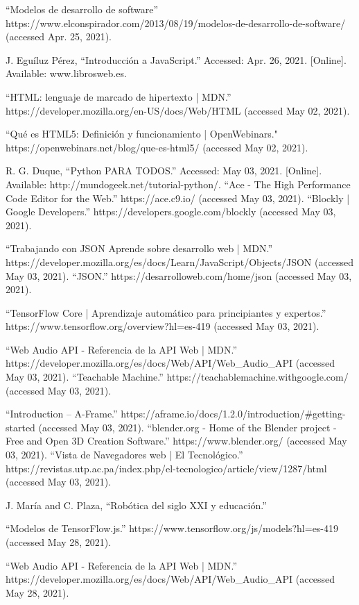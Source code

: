 \begin{thebibliography}{69}
 ``Modelos de desarrollo de software” https://www.elconspirador.com/2013/08/19/modelos-de-desarrollo-de-software/ (accessed Apr. 25, 2021).

 J. Eguíluz Pérez, “Introducción a JavaScript.” Accessed: Apr. 26, 2021. [Online]. Available: www.librosweb.es.


	``HTML: lenguaje de marcado de hipertexto | MDN.” https://developer.mozilla.org/en-US/docs/Web/HTML (accessed May 02, 2021).

 ``Qué es HTML5: Definición y funcionamiento | OpenWebinars." https://openwebinars.net/blog/que-es-html5/ (accessed May 02, 2021).


 R. G. Duque, ``Python PARA TODOS.” Accessed: May 03, 2021. [Online]. Available: http://mundogeek.net/tutorial-python/.
 ``Ace - The High Performance Code Editor for the Web.” https://ace.c9.io/ (accessed May 03, 2021).
 ``Blockly  |  Google Developers.” https://developers.google.com/blockly (accessed May 03, 2021).


 ``Trabajando con JSON \- Aprende sobre desarrollo web | MDN.” https://developer.mozilla.org/es/docs/Learn/JavaScript/Objects/JSON (accessed May 03, 2021).
 ``JSON.” https://desarrolloweb.com/home/json (accessed May 03, 2021).

 ``TensorFlow Core | Aprendizaje automático para principiantes y expertos.” https://www.tensorflow.org/overview?hl=es-419 (accessed May 03, 2021).

 ``Web Audio API - Referencia de la API Web | MDN.” https://developer.mozilla.org/es/docs/Web/API/Web\_Audio\_API (accessed May 03, 2021).
 ``Teachable Machine.” https://teachablemachine.withgoogle.com/ (accessed May 03, 2021).

 ``Introduction – A-Frame.” https://aframe.io/docs/1.2.0/introduction/\#getting-started (accessed May 03, 2021).
  ``blender.org - Home of the Blender project - Free and Open 3D Creation Software.” https://www.blender.org/ (accessed May 03, 2021).
 ``Vista de Navegadores web | El Tecnológico.” https://revistas.utp.ac.pa/index.php/el-tecnologico/article/view/1287/html (accessed May 03, 2021).

 J. María and C. Plaza, ``Robótica del siglo XXI y educación.”

 ``Modelos de TensorFlow.js.” https://www.tensorflow.org/js/models?hl=es-419 (accessed May 28, 2021).

 ``Web Audio API - Referencia de la API Web | MDN.” https://developer.mozilla.org/es/docs/Web/API/Web\_Audio\_API (accessed May 28, 2021).

\end{thebibliography}
